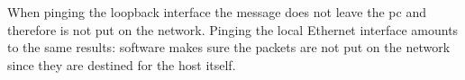 When pinging the loopback interface the message does not leave the pc and therefore is not put on the network. Pinging the local Ethernet interface amounts to the same results: software makes sure the packets are not put on the network since they are destined for the host itself.